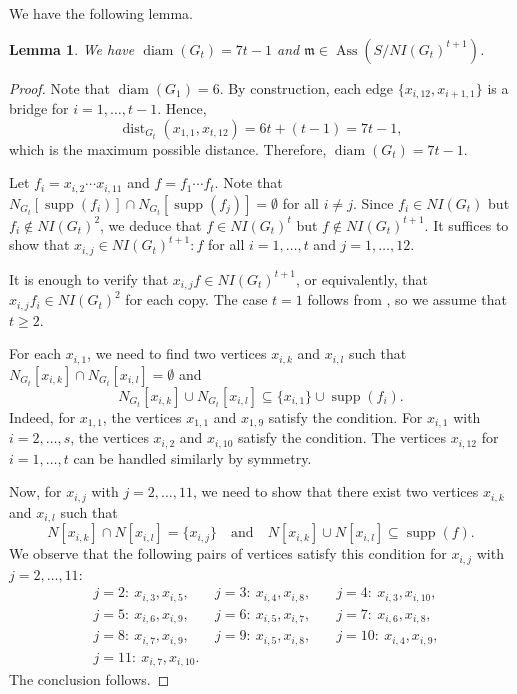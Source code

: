 \documentclass[12pt,reqno,twoside]{amsart}
\newcommand{\mm}{\mathfrak m}
\DeclareMathOperator{\diam}{diam}
\DeclareMathOperator{\Ass}{Ass}
\DeclareMathOperator{\dist}{dist}
\DeclareMathOperator{\supp}{supp}
\newtheorem{lem}[thm]{\bf Lemma}
\theoremstyle{definition}
\theoremstyle{plain}
\theoremstyle{remark}
\numberwithin{equation}{section}
\begin{document}
We have the following lemma.

\begin{lem}\label{lem_extreme_graph}
We have $\diam(G_t) = 7t - 1$ and $\mm \in \Ass(S/NI(G_t)^{t+1})$.
\end{lem}

\begin{proof} Note that $\diam (G_1) = 6$. By construction, each edge $\{x_{i,12}, x_{i+1,1}\}$ is a bridge for $i = 1,\ldots, t-1$. Hence,
\[
\dist_{G_t}(x_{1,1}, x_{t,12}) = 6t + (t - 1) = 7t - 1,
\]
which is the maximum possible distance. Therefore, $\diam(G_t) = 7t - 1$.

Let $f_i = x_{i,2} \cdots x_{i,11}$ and $f = f_1 \cdots f_t$. Note that $N_{G_t}[\supp(f_i)] \cap N_{G_t}[\supp(f_j)] = \emptyset$ for all $i \neq j$. Since $f_i \in NI(G_t)$ but $f_i \notin NI(G_t)^2$, we deduce that $f \in NI(G_t)^t$ but $f \notin NI(G_t)^{t+1}$. It suffices to show that $x_{i,j} \in NI(G_t)^{t+1} : f$ for all $i = 1, \ldots, t$ and $j = 1, \ldots, 12$.

It is enough to verify that $x_{i,j} f \in NI(G_t)^{t+1}$, or equivalently, that $x_{i,j} f_i \in NI(G_t)^2$ for each copy. The case $t=1$ follows from \cite[Example 2.10]{HV}, so we assume that $t \ge 2$. 

For each $x_{i,1}$, we need to find two vertices $x_{i,k}$ and $x_{i,l}$ such that $N_{G_t}[x_{i,k}] \cap N_{G_t}[x_{i,l}] = \emptyset$ and 
\[
N_{G_t}[x_{i,k}] \cup N_{G_t}[x_{i,l}] \subseteq \{x_{i,1}\} \cup \supp(f_i).
\]
Indeed, for $x_{1,1}$, the vertices $x_{1,1}$ and $x_{1,9}$ satisfy the condition. For $x_{i,1}$ with $i = 2, \ldots, s$, the vertices $x_{i,2}$ and $x_{i,10}$ satisfy the condition. The vertices $x_{i,12}$ for $i = 1, \ldots, t$ can be handled similarly by symmetry. 

Now, for $x_{i,j}$ with $j = 2, \ldots, 11$, we need to show that there exist two vertices $x_{i,k}$ and $x_{i,l}$ such that 
\[
N[x_{i,k}] \cap N[x_{i,l}] = \{x_{i,j}\} \quad \text{and} \quad N[x_{i,k}] \cup N[x_{i,l}] \subseteq \supp(f).
\]
We observe that the following pairs of vertices satisfy this condition for $x_{i,j}$ with $j = 2, \ldots, 11$:
\[
\begin{aligned}
&j=2: \ x_{i,3}, x_{i,5}, \quad 
&j=3: \ x_{i,4}, x_{i,8}, \quad 
&j=4: \ x_{i,3}, x_{i,10}, \\
&j=5: \ x_{i,6}, x_{i,9}, \quad 
&j=6: \ x_{i,5}, x_{i,7}, \quad 
&j=7: \ x_{i,6}, x_{i,8}, \\
&j=8: \ x_{i,7}, x_{i,9}, \quad 
&j=9: \ x_{i,5}, x_{i,8}, \quad 
&j=10: \ x_{i,4}, x_{i,9}, \\
&j=11: \ x_{i,7}, x_{i,10}.
\end{aligned}
\]
The conclusion follows.
\end{proof}
\end{document}
